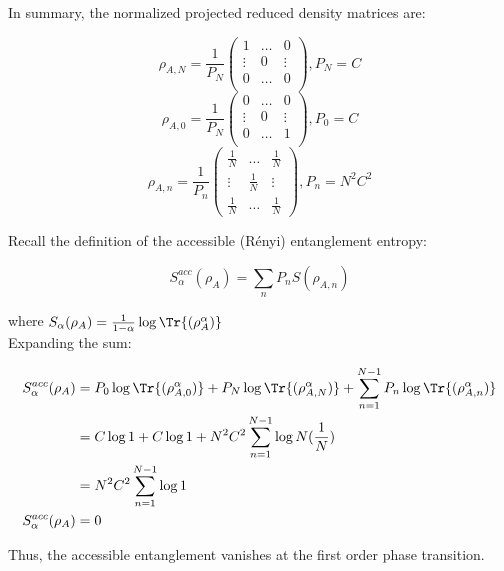 In summary, the normalized projected reduced density matrices are:

\begin{equation}
\rho_{A,N} = \frac{1}{P_{N}} \begin{pmatrix}
1 & \dots & 0 \\ 
\vdots & 0 & \vdots \\
0 & \dots & 0 \\
\end{pmatrix}, P_{N}=C 
\end{equation}
\begin{equation}
 \rho_{A,0} = \frac{1}{P_{N}} \begin{pmatrix}
0 & \dots & 0 \\ 
\vdots & 0 & \vdots \\
0 & \dots & 1 \\
\end{pmatrix}, P_{0}=C 
\end{equation}
\begin{equation}
\rho_{A,n} = \frac{1}{P_{n}} \begin{pmatrix}
\frac{1}{N} & \dots & \frac{1}{N} \\ 
\vdots & \frac{1}{N} & \vdots \\
\frac{1}{N} & \dots & \frac{1}{N}
\end{pmatrix}, P_{n}=N^2C^2 
\end{equation}

Recall the definition of the accessible (R\'enyi) entanglement entropy:

\[S_{\alpha}^{acc}(\rho_{A}) = \sum_{n} P_{n}S(\rho_{A,n})\]

where $S_{\alpha}(\rho_A) = \frac{1}{1-\alpha} \log{\Tr{(\rho_A^{\alpha})}}$
\\
Expanding the sum:

\begin{align}
S_{\alpha}^{acc}(\rho_{A}) &= P_{0} \log{\Tr{(\rho_{A,0}^{\alpha})}} + P_{N} \log{\Tr{(\rho_{A,N}^{\alpha})}} + \sum_{n=1}^{N-1} P_{n} \log{\Tr{(\rho_{A,n}^{\alpha})}} \nonumber \\
&= C \log{1} + C \log{1} + N^2C^2 \sum_{n=1}^{N-1} \log{N(\frac{1}{N})}  \nonumber \\
&= N^2C^2 \sum_{n=1}^{N-1} \log{1} \nonumber \\
S_{\alpha}^{acc}(\rho_{A}) &= 0 
\end{align}

Thus, the accessible entanglement vanishes at the first order phase transition. \\

